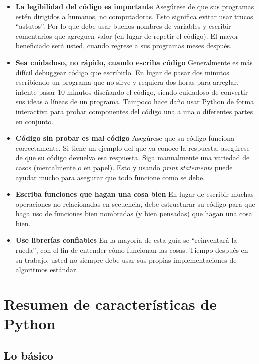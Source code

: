 \documentclass[11pt]{article}
\providecommand{\tightlist}{%
      \setlength{\itemsep}{0pt}\setlength{\parskip}{0pt}}
\begin{document}
\begin{itemize}
\tightlist
\item
  \textbf{La legibilidad del código es importante} Asegúrese de que sus
  programas estén dirigidos a humanos, no computadoras. Esto significa
  evitar usar trucos ``astutos''. Por lo que debe usar buenos nombres de
  variables y escribir comentarios que agreguen valor (en lugar de
  repetir el código). El mayor beneficiado será usted, cuando regrese a
  sus programas meses después.
\item
  \textbf{Sea cuidadoso, no rápido, cuando escriba código} Generalmente
  es más difícil debuggear código que escribirlo. En lugar de pasar dos
  minutos escribiendo un programa que no sirve y requiera dos horas para
  arreglar, intente pasar 10 minutos diseñando el código, siendo
  cuidadoso de convertir sus ideas a líneas de un programa. Tampoco hace
  daño usar Python de forma interactiva para probar componentes del
  código una a una o diferentes partes en conjunto.
\item
  \textbf{Código sin probar es mal código} Asegúrese que su código
  funciona correctamente. Si tiene un ejemplo del que ya conoce la
  respuesta, asegúrese de que su código devuelva esa respuesta. Siga
  manualmente una variedad de casos (mentalmente o en papel). Esto y
  usando \emph{print statements} puede ayudar mucho para asegurar que
  todo funcione como se debe.
\item
  \textbf{Escriba funciones que hagan una cosa bien} En lugar de
  escribir muchas operaciones no relacionadas en secuencia, debe
  estructurar su código para que haga uso de funciones bien nombradas (y
  bien pensadas) que hagan una cosa bien.
\item
  \textbf{Use librerías confiables} En la mayoría de esta guía se
  ``reinventará la rueda'', con el fin de entender cómo funcionan las
  cosas. Tiempo después en su trabajo, usted no siempre debe usar sus
  propias implementaciones de algoritmos estándar.
\end{itemize}

\hypertarget{resumen-de-caracteruxedsticas-de-python}{%
\section{Resumen de características de
Python}\label{resumen-de-caracteruxedsticas-de-python}}

\hypertarget{lo-buxe1sico}{%
\subsection{Lo básico}\label{lo-buxe1sico}}
\end{document}
